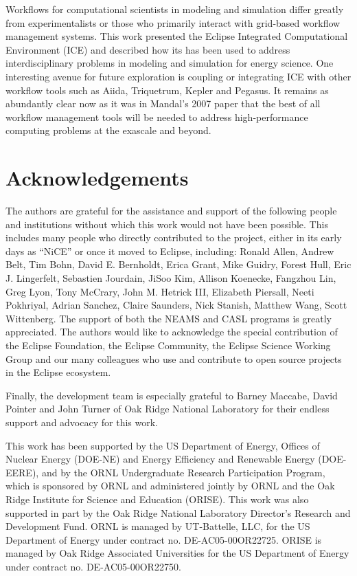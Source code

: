 Workflows for computational scientists in modeling and simulation differ
greatly from experimentalists or those who primarily interact with
grid-based workflow management systems. This work presented the Eclipse
Integrated Computational Environment (ICE) and described how its has
been used to address interdisciplinary problems in modeling and
simulation for energy science. One interesting avenue for future
exploration is coupling or integrating ICE with other workflow tools
such as Aiida, Triquetrum, Kepler and Pegasus. It remains as abundantly
clear now as it was in Mandal's 2007 paper that the best of all workflow
management tools will be needed to address high-performance computing
problems at the exascale and beyond.

\section*{Acknowledgements}\label{acknowledgements}

The authors are grateful for the assistance and support of the following
people and institutions without which this work would not have been
possible. This includes many people who directly contributed to the
project, either in its early days as ``NiCE'' or once it moved to
Eclipse, including: Ronald Allen, Andrew Belt, Tim Bohn, David E.
Bernholdt, Erica Grant, Mike Guidry, Forest Hull, Eric J. Lingerfelt,
Sebastien Jourdain, JiSoo Kim, Allison Koenecke, Fangzhou Lin, Greg
Lyon, Tony McCrary, John M. Hetrick III, Elizabeth Piersall, Neeti
Pokhriyal, Adrian Sanchez, Claire Saunders, Nick Stanish, Matthew Wang,
Scott Wittenberg. The support of both the NEAMS and CASL programs is
greatly appreciated. The authors would like to acknowledge the special
contribution of the Eclipse Foundation, the Eclipse Community, the
Eclipse Science Working Group and our many colleagues who use and
contribute to open source projects in the Eclipse ecosystem.

Finally, the development team is especially grateful to Barney Maccabe,
David Pointer and John Turner of Oak Ridge National Laboratory for their
endless support and advocacy for this work.

This work has been supported by the US Department of Energy, Offices of
Nuclear Energy (DOE-NE) and Energy Efficiency and Renewable Energy
(DOE-EERE), and by the ORNL Undergraduate Research Participation
Program, which is sponsored by ORNL and administered jointly by ORNL and
the Oak Ridge Institute for Science and Education (ORISE). This work was
also supported in part by the Oak Ridge National Laboratory Director's
Research and Development Fund. ORNL is managed by UT-Battelle, LLC, for
the US Department of Energy under contract no. DE-AC05-00OR22725. ORISE
is managed by Oak Ridge Associated Universities for the US Department of
Energy under contract no. DE-AC05-00OR22750.

